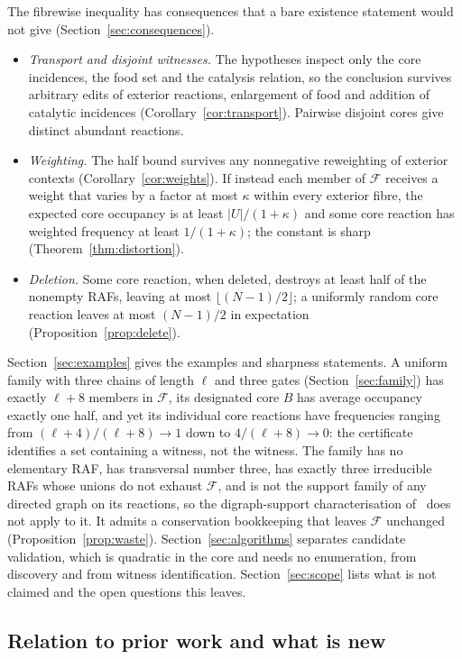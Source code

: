 \documentclass[11pt,a4paper]{article}
\theoremstyle{plain}
\theoremstyle{definition}
\theoremstyle{remark}
\newcommand{\FF}{\mathcal F}
\begin{document}
The fibrewise inequality has consequences that a bare existence statement would not give (Section~\ref{sec:consequences}).
\begin{itemize}
\item \emph{Transport and disjoint witnesses.} The hypotheses inspect only the core incidences, the food set and the catalysis relation, so the conclusion survives arbitrary edits of exterior reactions, enlargement of food and addition of catalytic incidences (Corollary~\ref{cor:transport}). Pairwise disjoint cores give distinct abundant reactions.
\item \emph{Weighting.} The half bound survives any nonnegative reweighting of exterior contexts (Corollary~\ref{cor:weights}). If instead each member of $\FF$ receives a weight that varies by a factor at most $\kappa$ within every exterior fibre, the expected core occupancy is at least $|U|/(1+\kappa)$ and some core reaction has weighted frequency at least $1/(1+\kappa)$; the constant is sharp (Theorem~\ref{thm:distortion}).
\item \emph{Deletion.} Some core reaction, when deleted, destroys at least half of the nonempty RAFs, leaving at most $\lfloor(N-1)/2\rfloor$; a uniformly random core reaction leaves at most $(N-1)/2$ in expectation (Proposition~\ref{prop:delete}).
\end{itemize}

Section~\ref{sec:examples} gives the examples and sharpness statements. A uniform family with three chains of length $\ell$ and three gates (Section~\ref{sec:family}) has exactly $\ell+8$ members in $\FF$, its designated core $B$ has average occupancy exactly one half, and yet its individual core reactions have frequencies ranging from $(\ell+4)/(\ell+8)\to1$ down to $4/(\ell+8)\to0$: the certificate identifies a set containing a witness, not the witness. The family has no elementary RAF, has transversal number three, has exactly three irreducible RAFs whose unions do not exhaust $\FF$, and is not the support family of any directed graph on its reactions, so the digraph-support characterisation of~\cite{digraph2026} does not apply to it. It admits a conservation bookkeeping that leaves $\FF$ unchanged (Proposition~\ref{prop:waste}). Section~\ref{sec:algorithms} separates candidate validation, which is quadratic in the core and needs no enumeration, from discovery and from witness identification. Section~\ref{sec:scope} lists what is not claimed and the open questions this leaves.

\subsection{Relation to prior work and what is new}
\end{document}
